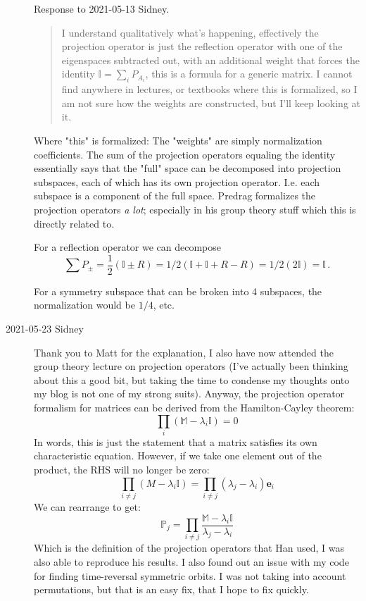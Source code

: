 \begin{description}
Response to 2021-05-13 Sidney.
\begin{quote}
I understand qualitatively what’s happening, effectively the projection operator is just the reflection operator with one of
the eigenspaces subtracted out, with an additional weight that forces the
identity $\mathbb{I} = \sum_i P_{A_i}$, this is a formula for a generic matrix. I cannot find
anywhere in lectures, or textbooks where this is formalized, so I am not
sure how the weights are constructed, but I’ll keep looking at it.
\end{quote}
Where "this" is formalized: The "weights" are simply normalization coefficients. The sum of the projection operators equaling the identity essentially says that the "full" space can be decomposed into projection subspaces, each of which has its own projection operator. I.e.
each subspace is a component of the full space. Predrag formalizes
the projection operators \textit{a lot}; especially in his group theory stuff which this is directly related to.

For a reflection operator we can decompose
$$\sum P_{\pm} = \frac{1}{2}(\mathbb{I}\pm R) = 1/2 (\mathbb{I} + \mathbb{I} + R - R)
               = 1/2 (2\mathbb{I}) = \mathbb{I}\,.$$

For a symmetry subspace that can be broken into 4 subspaces, the normalization would be $1/4$, etc.

\item[2021-05-23 Sidney]
Thank you to Matt for the explanation, I also have now attended the group theory lecture on projection operators (I've actually been thinking about this a good bit, but taking the time to condense my thoughts onto my blog is not one of my strong suits). Anyway, the projection operator formalism for matrices can be derived from the Hamilton-Cayley theorem:
$$\prod_i\left(\mathbb{M}-\lambda_i\mathbb{I}\right)=0$$
In words, this is just the statement that a matrix satisfies its own characteristic equation. However, if we take one element out of the product, the RHS will no longer be zero:
$$\prod_{i\neq j}\left(M-\lambda_i\mathbb{I}\right)=\prod_{i\neq j}\left(\lambda_j-\lambda_i\right)\textbf{e}_i$$
We can rearrange to get:
$$\mathbb{P}_j=\prod_{i\neq j}\frac{\mathbb{M}-\lambda_i\mathbb{I}}{\lambda_j-\lambda_i}$$
Which is the definition of the projection operators that Han used, I was also
able to reproduce his results. I also found out an issue with my code for
finding time-reversal symmetric orbits. I was not taking into account
permutations, but that is an easy fix, that I hope to fix quickly.


\end{description}
